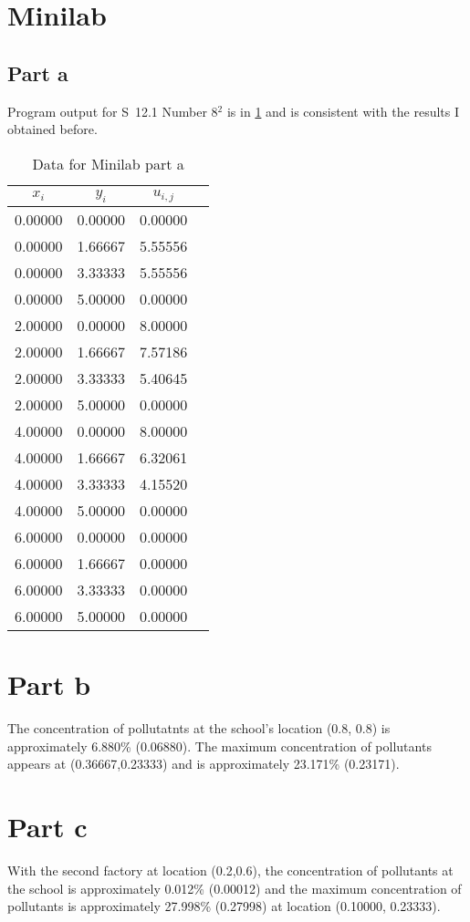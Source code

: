 \documentclass[12pt]{article}
\begin{document}
\section{Minilab}
\subsection{Part a}
Program output for S~12.1 Number 8$^2$ is in \cref{tab:mini_a} and is
consistent with the results I obtained before.
\begin{table}[h]
  \centering
  \begin{tabular}{cccc}
    \hline
    $x_i$ & $y_i$ & $u_{i,j}$ \\
    \hline
    0.00000 & 0.00000 & 0.00000 \\
    0.00000 & 1.66667 & 5.55556 \\
    0.00000 & 3.33333 & 5.55556 \\
    0.00000 & 5.00000 & 0.00000 \\
    2.00000 & 0.00000 & 8.00000 \\
    2.00000 & 1.66667 & 7.57186 \\
    2.00000 & 3.33333 & 5.40645 \\
    2.00000 & 5.00000 & 0.00000 \\
    4.00000 & 0.00000 & 8.00000 \\
    4.00000 & 1.66667 & 6.32061 \\
    4.00000 & 3.33333 & 4.15520 \\
    4.00000 & 5.00000 & 0.00000 \\
    6.00000 & 0.00000 & 0.00000 \\
    6.00000 & 1.66667 & 0.00000 \\
    6.00000 & 3.33333 & 0.00000 \\
    6.00000 & 5.00000 & 0.00000 \\
    \hline
  \end{tabular}
  \caption{Data for Minilab part a}
\label{tab:mini_a}
\end{table}

\section{Part b}
The concentration of pollutatnts at the school's location (0.8, 0.8)
is approximately 6.880\% (0.06880). The maximum concentration of
pollutants appears at (0.36667,0.23333) and is approximately 23.171\%
(0.23171). 
\section{Part c}
With the second factory at location (0.2,0.6), the concentration of
pollutants at the school is approximately 0.012\% (0.00012) and the
maximum concentration of pollutants is approximately 27.998\%
(0.27998) at location (0.10000, 0.23333).
\end{document}

